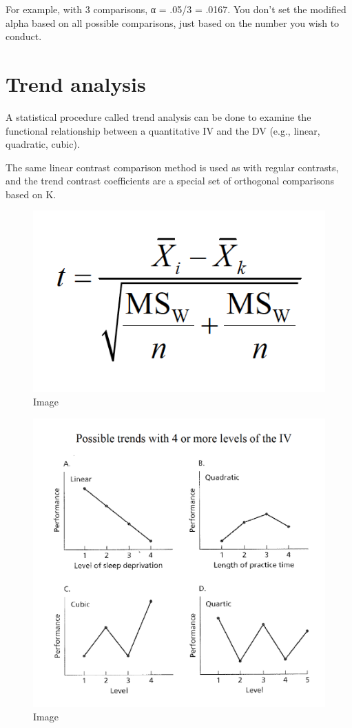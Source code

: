 \documentclass[]{book}
\theoremstyle{definition}
\theoremstyle{definition}
\theoremstyle{definition}
\theoremstyle{remark}
\begin{document}
For example, with 3 comparisons, α = .05/3 = .0167. You don't set the
modified alpha based on all possible comparisons, just based on the
number you wish to conduct.

\section{Trend analysis}\label{trend-analysis}

A statistical procedure called trend analysis can be done to examine the
functional relationship between a quantitative IV and the DV (e.g.,
linear, quadratic, cubic).

The same linear contrast comparison method is used as with regular
contrasts, and the trend contrast coefficients are a special set of
orthogonal comparisons based on K.

\begin{figure}
\centering
\includegraphics{img/hicksphc20.png}
\caption{Image}
\end{figure}

\begin{figure}
\centering
\includegraphics{img/hicksphc21.png}
\caption{Image}
\end{figure}
\end{document}
